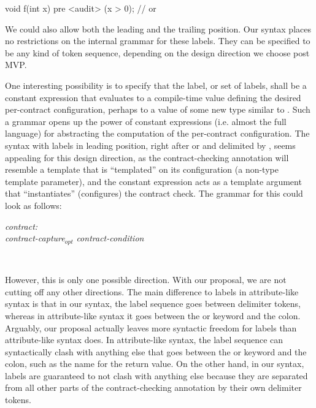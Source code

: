 \vspace{2mm}
\begin{codeblock}
void f(int x)
  pre <audit> (x > 0);    // or 
\end{codeblock}
\vspace{2mm}

We could also allow both the leading and the trailing position. Our syntax places no restrictions on the internal grammar for these labels. They can be specified to be any kind of token sequence, depending on the design direction we choose post MVP.

One interesting possibility is to specify that the label, or set of labels, shall be a constant expression that evaluates to a compile-time value defining the desired per-contract configuration, perhaps to a value of some new type  similar to . Such a grammar opens up the power of constant expressions (i.e. almost the full language) for abstracting the computation of the per-contract configuration. The syntax with labels in leading position, right after  or  and delimited by \mbox{}, seems appealing for this design direction, as the contract-checking annotation will resemble a template that is ``templated'' on its configuration (a non-type template parameter), and the constant expression acts as a template argument that ``instantiates'' (configures) the contract check. The grammar for this could look as follows:

\begin{adjustwidth}{0.5cm}{0.5cm}

\emph{contract:} \\
\phantom{~~~} \emph{contract-capture}$_{opt}$ \emph{contract-condition}

 \\
\phantom{~~~}

\end{adjustwidth}

However, this is only one possible direction. With our proposal, we are not cutting off any other directions. The main difference to labels in attribute-like syntax is that in our syntax, the label sequence goes between delimiter tokens, whereas in attribute-like syntax it goes between the  or  keyword and the colon. Arguably, our proposal actually leaves more syntactic freedom for labels than attribute-like syntax does. In attribute-like syntax, the label sequence can syntactically clash with anything else that goes between the  or  keyword and the colon, such as the name for the return value. On the other hand, in our syntax, labels are guaranteed to not clash with anything else because they are separated from all other parts of the contract-checking annotation by their own delimiter tokens.

